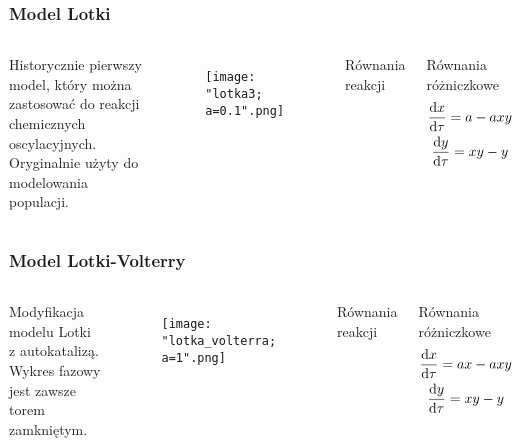 \documentclass{beamer}
\begin{document}
\begin{frame}
\frametitle{Model Lotki}
\begin{columns}
Historycznie pierwszy model, który można zastosować do reakcji chemicznych oscylacyjnych. Oryginalnie użyty do modelowania populacji. \\
\begin{figure}
\texttt{[image: "lotka3; a=0.1".png]}
\end{figure}
\begin{block}{Równania reakcji}
\begin{center}
	 \\
	 \\
\end{center}
\end{block}
\begin{block}{Równania różniczkowe}
\begin{gather*}
	\dv{x}{\tau} = a-axy \\
	\dv{y}{\tau} = xy-y
\end{gather*}
\end{block}
\end{columns}
\end{frame}

\begin{frame}
\frametitle{Model Lotki-Volterry}
\begin{columns}
Modyfikacja modelu Lotki z autokatalizą. Wykres fazowy jest zawsze torem zamkniętym.  
\begin{figure}
\texttt{[image: "lotka\_volterra; a=1".png]}
\end{figure}
\begin{block}{Równania reakcji}
\begin{center}
	 \\
	 \\
\end{center}
\end{block}
\begin{block}{Równania różniczkowe}
\begin{gather*}
	\dv{x}{\tau} = ax-axy \\
	\dv{y}{\tau} = xy-y
\end{gather*}
\end{block}
\end{columns}
\end{frame}
\end{document}
